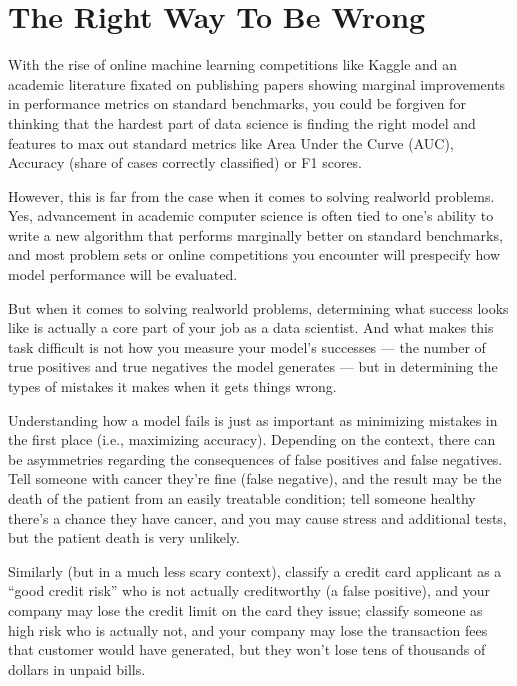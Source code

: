 \documentclass[letterpaper,10pt,english]{jupyterBook}
\begin{document}
\sphinxstepscope


\chapter{The Right Way To Be Wrong}
\label{\detokenize{30_questions/24_passive_internal_errors:the-right-way-to-be-wrong}}\label{\detokenize{30_questions/24_passive_internal_errors::doc}}
\sphinxAtStartPar
With the rise of online machine learning competitions like Kaggle and an academic literature fixated on publishing papers showing marginal improvements in performance metrics on standard benchmarks, you could be forgiven for thinking that the hardest part of data science is finding the right model and features to max out standard metrics like Area Under the Curve (AUC), Accuracy (share of cases correctly classified) or F1 scores.

\sphinxAtStartPar
However, this is far from the case when it comes to solving real\sphinxhyphen{}world problems. Yes, advancement in academic computer science is often tied to one’s ability to write a new algorithm that performs marginally better on standard benchmarks, and most problem sets or online competitions you encounter will pre\sphinxhyphen{}specify how model performance will be evaluated.

\sphinxAtStartPar
But when it comes to solving real\sphinxhyphen{}world problems, determining what success looks like is actually a core part of your job as a data scientist. And what makes this task difficult is not how you measure your model’s successes — the number of true positives and true negatives the model generates — but in determining the types of mistakes it makes when it gets things wrong.

\sphinxAtStartPar
Understanding how a model fails is just as important as minimizing mistakes in the first place (i.e., maximizing accuracy). Depending on the context, there can be  asymmetries regarding the consequences of false positives and false negatives. Tell someone with cancer they’re fine (false negative), and the result may be the death of the patient from an easily treatable condition; tell someone healthy there’s a chance they have cancer, and you may cause stress and additional tests, but the patient death is very unlikely.

\sphinxAtStartPar
Similarly (but in a much less scary context), classify a credit card applicant as a “good credit risk” who is not actually credit\sphinxhyphen{}worthy (a false positive), and your company may lose the credit limit on the card they issue; classify someone as high risk who is actually not, and your company may lose the transaction fees that customer would have generated, but they won’t lose tens of thousands of dollars in unpaid bills.
\end{document}
